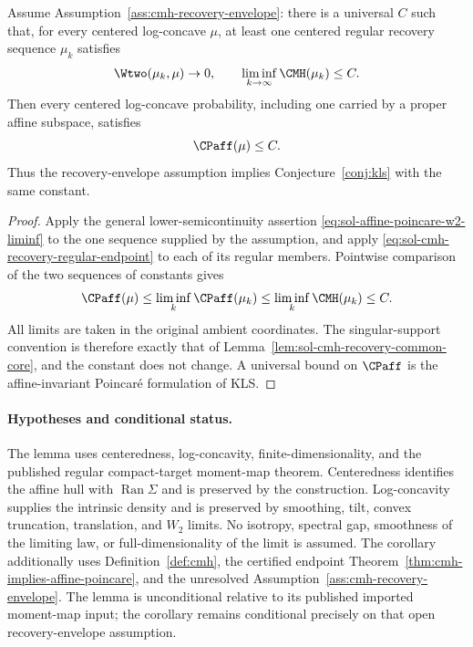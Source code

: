 \documentclass[../main.tex]{subfiles}
\begin{document}
\begin{corollary}
\label{cor:sol-cmh-recovery-sequence-suffices}
Assume Assumption~\ref{ass:cmh-recovery-envelope}: there is a universal $C$ such that, for every
centered log-concave $\mu$, at least one centered regular recovery sequence $\mu_k$ satisfies
\[
  \Wtwo(\mu_k,\mu)\to0,
  \qquad
  \liminf_{k\to\infty}\CMH(\mu_k)\le C.
\]
Then every centered log-concave probability, including one carried by a proper affine
subspace, satisfies
\[
  \CPaff(\mu)\le C.
\]
Thus the recovery-envelope assumption implies Conjecture~\ref{conj:kls} with the same constant.
\end{corollary}

\begin{proof}
Apply the general lower-semicontinuity assertion
\eqref{eq:sol-affine-poincare-w2-liminf} to the one sequence supplied by the assumption, and
apply \eqref{eq:sol-cmh-recovery-regular-endpoint} to each of its regular members.  Pointwise
comparison of the two sequences of constants gives
\[
  \CPaff(\mu)
  \le\liminf_k\CPaff(\mu_k)
  \le\liminf_k\CMH(\mu_k)
  \le C.
\]
All limits are taken in the original ambient coordinates.  The singular-support convention is
therefore exactly that of Lemma~\ref{lem:sol-cmh-recovery-common-core}, and the constant does not
change.  A universal bound on $\CPaff$ is the affine-invariant Poincar\'e formulation of KLS.
\end{proof}

\paragraph{Hypotheses and conditional status.}
The lemma uses centeredness, log-concavity, finite-dimensionality, and the published regular
compact-target moment-map theorem.  Centeredness identifies the affine hull with
$\operatorname{Ran}\Sigma$ and is preserved by the construction.  Log-concavity supplies the intrinsic
density and is preserved by smoothing, tilt, convex truncation, translation, and $W_2$ limits.
No isotropy, spectral gap, smoothness of the limiting law, or full-dimensionality of the limit
is assumed.  The corollary additionally uses Definition~\ref{def:cmh}, the certified endpoint
Theorem~\ref{thm:cmh-implies-affine-poincare}, and the unresolved
Assumption~\ref{ass:cmh-recovery-envelope}.  The lemma is unconditional relative to its
published imported moment-map input; the corollary remains conditional precisely on that open
recovery-envelope assumption.
\end{document}

